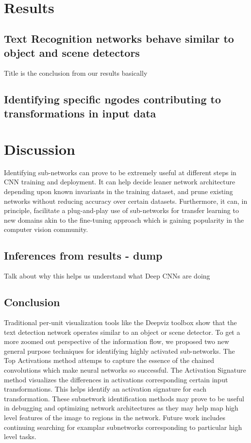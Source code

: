 \documentclass[10pt,twocolumn,letterpaper]{article}
\begin{document}
\section{Results}

\subsection{Text Recognition networks behave similar to object and scene detectors}
Title is the conclusion from our results basically 



\subsection{Identifying specific ngodes contributing to transformations in input data}

\section{Discussion}
Identifying sub-networks can prove to be extremely useful at different steps in CNN training and deployment. It can help decide leaner network architecture depending upon known invariants in the training dataset, and prune existing networks without reducing accuracy over certain datasets. Furthermore, it can, in principle, facilitate a plug-and-play use of sub-networks for transfer learning to new domains akin to the fine-tuning approach which is gaining popularity in the computer vision community.

\subsection{Inferences from results - dump}
Talk about why this helps us understand what Deep CNNs are doing


\subsection{Conclusion}
Traditional per-unit visualization tools like the Deepviz toolbox \cite{} show that the text detection network operates similar to an object or scene detector. To get a more zoomed out perspective of the information flow, we proposed two new general purpose techniques for identifying highly activated sub-networks. The Top Activations method attemps to capture the essence of the chained convolutions which make neural networks so successful. The Activation Signature method visualizes the differences in activations corresponding certain input transformations. This helps identify an activation signature for each transformation. These subnetwork identification methods may prove to be useful in debugging and optimizing network architectures as they may help map high level features of the image to regions in the network. Future work includes continuing searching for examplar subnetworks corresponding to particular high level tasks.


{\small


}
\end{document}
